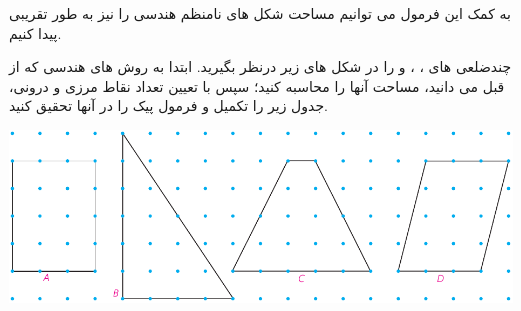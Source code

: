 \documentclass[12pt, a4paper]{book}
\begin{document}
به کمک این فرمول می توانیم مساحت شکل های نامنظم هندسی را نیز به طور تقریبی پیدا کنیم.

چندضلعی های 
 ،
 ،
 و
را در شکل های زیر درنظر بگیرید. ابتدا به روش های هندسی که از قبل می دانید، مساحت آنها را محاسبه کنید؛ سپس با تعیین تعداد نقاط مرزی و درونی، جدول زیر را تکمیل و فرمول پیک را در آنها تحقیق کنید.
\smallskip

\begin{minipage}{1\textwidth}
	\begin{center}
		\includegraphics{"Shapes/Fasl - 3/Dars 2/P71-S1.pdf"}
	\end{center}
\end{minipage}

\newpage
\end{document}
